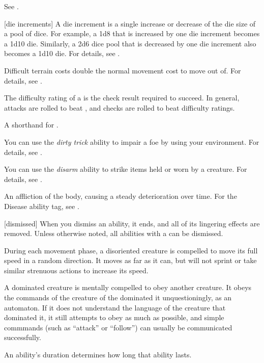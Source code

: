  See .

[die increments] A die increment is a single increase or decrease of the die size of a pool of dice.
For example, a 1d8 that is increased by one die increment becomes a 1d10 die.
Similarly, a 2d6 dice pool that is decreased by one die increment also becomes a 1d10 die.
For details, see .

 Difficult terrain costs double the normal movement cost to move out of.
For details, see .

 The difficulty rating of a  is the check result required to succeed.
In general, attacks are rolled to beat , and checks are rolled to beat difficulty ratings.

 A shorthand for .

 You can use the \textit{dirty trick} ability to impair a foe by using your environment.
For details, see .

 You can use the \textit{disarm} ability to strike items held or worn by a creature.
For details, see .

 An affliction of the body, causing a steady deterioration over time. For the Disease ability tag, see .

[dismissed] When you dismiss an ability, it ends, and all of its lingering effects are removed.
Unless otherwise noted, all abilities with a  can be dismissed.

 During each movement phase, a disoriented creature is compelled to move its full speed in a random direction.
It moves as far as it can, but will not sprint or take similar strenuous actions to increase its speed.

 A dominated creature is mentally compelled to obey another creature.
It obeys the commands of the creature of the dominated it unquestioningly, as an automaton.
If it does not understand the language of the creature that dominated it, it still attempts to obey as much as possible, and simple commmands (such as ``attack'' or ``follow'') can usually be communicated successfully.

 An ability's duration determines how long that ability lasts.

